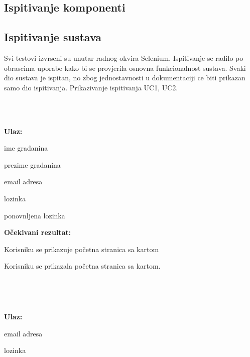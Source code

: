 			\subsection{Ispitivanje komponenti}
		
			
			\subsection{Ispitivanje sustava}
			
			Svi testovi izvrseni su unutar radnog okvira Selenium. Ispitivanje se radilo po obrascima uporabe kako bi se provjerila osnovna funkcionalnost sustava. Svaki dio sustava je ispitan, no zbog jednostavnosti u dokumentaciji ce biti prikazan samo dio ispitivanja. Prikazivanje ispitivanja UC1, UC2. \\\


			
			\
			
			\noindent \textbf{Ulaz:}
			
			\begin{packed_enum}
				\item ime građanina
				\item prezime građanina			
				\item email adresa
				\item lozinka
				\item ponovnljena lozinka
				
				
			\end{packed_enum}


			\noindent \textbf{Očekivani rezultat:}
				\begin{packed_enum}
				\item Korisniku se prikazuje početna stranica sa kartom
							
				
			\end{packed_enum}
			
		
			Korisniku se prikazala početna stranica sa kartom.			


			\
			
			
			\
			
			\noindent \textbf{Ulaz:}
			
			\begin{packed_enum}		
				\item email adresa
				\item lozinka
				
				
			\end{packed_enum}


